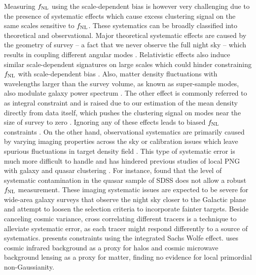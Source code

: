 Measuring $f_{\rm NL}$ using the scale-dependent bias is however very challenging due to the presence of systematic effects which cause excess clustering signal on the same scales sensitive to $f_{\rm NL}$. These systematics can be broadly classified into theoretical and observational. Major theoretical systematic effects are caused by the geometry of survey -- a fact that we never observe the full night sky -- which results in coupling different angular modes . Relativistic effects also induce similar scale-dependent signatures on large scales which could hinder constraining $f_{\rm NL}$ with scale-dependent bias \citep{wang2020}. Also, matter density fluctuations with wavelengths larger than the survey volume, as known as super-sample modes, also modulate galaxy power spectrum \citep{castorina2020JCAP}. The other effect is commonly referred to as integral constraint and is raised due to our estimation of the mean density directly from data itself, which pushes the clustering signal on modes near the size of survey to zero . Ignoring any of these effects leads to biased $f_{\rm NL}$ constraints . On the other hand, observational systematics are primarily caused by varying imaging properties across the sky or calibration issues which leave spurious fluctuations in target density field . This type of systematic error is much more difficult to handle and has hindered previous studies of local PNG with galaxy and quasar clustering \citep[see, e.g.,][]{Ho2015JCAP...05..040H}. For instance, \cite{pullen2013systematic} found that the level of systematic contamination in the quasar sample of SDSS  does not allow a robust $f_{\rm NL}$ measurement. These imaging systematic issues are expected to be severe for wide-area galaxy surveys that observe the night sky closer to the Galactic plane and attempt to loosen the selection criteria to incorporate fainter targets. Beside canceling cosmic variance, cross correlating different tracers is a technique to alleviate systematic error, as each tracer might respond differently to a source of systematics.  presents constraints using the integrated Sachs Wolfe effect.  uses cosmic infrared background as a proxy for halos and cosmic microwave background lensing as a proxy for matter, finding no evidence for local primordial non-Gaussianity. 


